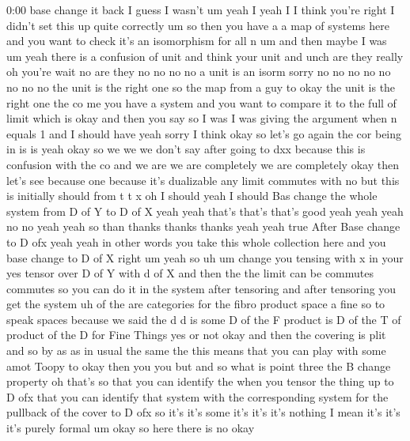 \begin{unfinished}{0:00}
base  change  it  back  I  guess  I  wasn't  um
yeah  I  yeah  I  I  think  you're  right  I
didn't  set  this  up  quite  correctly  um  so
then  you  have  a  a  map  of  systems  here
and  you  want  to  check  it's  an
isomorphism  for  all  n  um  and  then  maybe
I  was
um  yeah  there  is  a  confusion  of
unit  and  think  your  unit  and  unch  are
they  really
oh  you're  wait  no  are  they  no  no  no  no  a
unit  is  an
isorm  sorry  no  no  no  no  no  no  no  no  the
unit  is  the  right  one  so  the  map  from  a
guy  to  okay  the  unit  is  the  right  one
the  co  me  you  have  a  system  and  you  want
to  compare  it  to  the  full  of  limit  which
is  okay  and  then  you  say  so  I  was  I  was
giving  the  argument  when  n  equals  1  and
I  should  have  yeah  sorry  I  think  okay  so
let's  go  again  the  cor  being  in  is
is
yeah  okay  so  we  we  we  don't  say  after
going  to  dxx  because  this  is  confusion
with  the  co  and  we  are  we  are  completely
we  are  completely  okay  then  let's  see
because  one  because  it's
dualizable  any  limit  commutes  with  no
but  this
is  initially  should  from  t  t
x  oh  I  should  yeah  I  should  Bas  change
the  whole  system  from  D  of  Y  to  D  of  X
yeah  yeah  that's  that's  that's  good  yeah
yeah  yeah  no  no  yeah  yeah  so  than  thanks
thanks  thanks
yeah
yeah  true  After  Base
change  to  D  ofx  yeah  yeah  in  other  words
you  take  this  whole  collection  here  and
you  base  change  to  D  of
X  right  um  yeah
so  uh
um  change  you  tensing  with  x  in  your  yes
tensor  over  D  of  Y  with  d  of
X  and  then
the  the  limit  can  be  commutes  commutes
so  you  can  do  it  in  the  system  after
tensoring  and  after  tensoring  you  get
the
system  uh
of  the  are  categories  for  the  fibro
product  space  a  fine  so  to  speak  spaces
because  we
said  the
d  d
is  some  D  of  the  F  product  is  D  of  the  T
of  product  of  the  D  for  Fine  Things  yes
or  not
okay  and  then  the  covering  is
plit  and  so  by  as  as  in  usual  the  same
the  this  means  that  you  can  play  with
some  amot  Toopy
to  okay  then  you  you  but  and  so  what  is
point  three  the  B  change  property  oh
that's  so  that  you  can  identify  the  when
you
tensor  the  thing  up  to  D  ofx  that  you
can  identify  that  system  with  the
corresponding  system  for  the  pullback  of
the  cover  to  D  ofx  so  it's  it's  some
it's  it's  it's  nothing  I  mean  it's  it's
it's  purely  formal  um  okay  so  here  there
is
no  okay

\end{unfinished}
